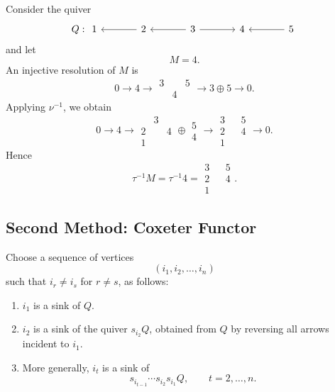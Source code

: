 \documentclass[11pt, a4paper]{report}
\begin{document}
\begin{example}
    Consider the quiver
    \[
    Q:
    \begin{tikzcd}[column sep=large]
        1 & 2 \arrow[l] & 3 \arrow[l] \arrow[r] & 4 & 5 \arrow[l]
    \end{tikzcd}
    \]
    and let
    \[
        M=4.
    \]
    An injective resolution of \(M\) is
    \[
        0
        \longrightarrow
        4
        \longrightarrow
        \begin{array}{ccc}
            3 && 5\\[-1mm]
            &4&
        \end{array}
        \longrightarrow
        3\oplus 5
        \longrightarrow
        0.
    \]
    Applying \(\nu^{-1}\), we obtain
    \[
        0
        \longrightarrow
        4
        \longrightarrow
        \begin{array}{ccc}
            &3&\\[-1mm]
            2&&4\\[-1mm]
            1&&
        \end{array}
        \oplus
        \begin{array}{c}
            5\\[-1mm]
            4
        \end{array}
        \longrightarrow
        \begin{array}{ccc}
            3&&5\\[-1mm]
            2&&4\\[-1mm]
            1&&
        \end{array}
        \longrightarrow
        0.
    \]
    Hence
    \[
        \tau^{-1}M
        =
        \tau^{-1}4
        =
        \begin{array}{ccc}
            3&&5\\[-1mm]
            2&&4\\[-1mm]
            1&&
        \end{array}.
    \]
\end{example}

\subsection{Second Method: Coxeter Functor}

Choose a sequence of vertices
\[
    (i_1,i_2,\dots,i_n)
\]
such that \(i_r\neq i_s\) for \(r\neq s\), as follows:

\begin{enumerate}
    \item \(i_1\) is a sink of \(Q\).
    \item \(i_2\) is a sink of the quiver \(s_{i_2}Q\), obtained from \(Q\) by
    reversing all arrows incident to \(i_1\).
    \item More generally, \(i_t\) is a sink of
    \[
        s_{i_{t-1}}\cdots s_{i_2}s_{i_1}Q,
        \qquad t=2,\dots,n.
    \]
\end{enumerate}
\end{document}
